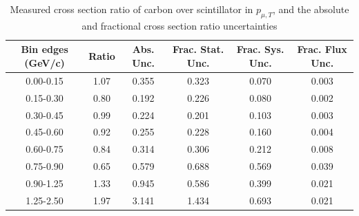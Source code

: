 \documentclass[../main.tex]{subfiles}
\begin{document}
\begin{table}
  \centering
  \renewcommand{\arraystretch}{1.15}
  \caption{Systematic covariance matrix of measured cross section ratio of carbon over scintillator in $p_{\mu,||}$}
  \label{tbl:rationucleonnuc6muon_pzc}
\end{table}
\begin{table}
  \centering
  \renewcommand{\arraystretch}{1.15}
  \caption{Measured cross section ratio of carbon over scintillator in $p_{\mu,T}$, and the absolute and fractional cross section ratio uncertainties}
    \begin{tabular}{c||c|c||c|c|c}
      Bin edges (GeV/c) &  Ratio  &  Abs. Unc.  &  Frac. Stat. Unc.  &  Frac. Sys. Unc.  &  Frac. Flux Unc. \\
      \hline
      \hline
      0.00-0.15 & 1.07 & 0.355 & 0.323 & 0.070 & 0.003\\
      0.15-0.30 & 0.80 & 0.192 & 0.226 & 0.080 & 0.002\\
      0.30-0.45 & 0.99 & 0.224 & 0.201 & 0.103 & 0.003\\
      0.45-0.60 & 0.92 & 0.255 & 0.228 & 0.160 & 0.004\\
      0.60-0.75 & 0.84 & 0.314 & 0.306 & 0.212 & 0.008\\
      0.75-0.90 & 0.65 & 0.579 & 0.688 & 0.569 & 0.039\\
      0.90-1.25 & 1.33 & 0.945 & 0.586 & 0.399 & 0.021\\
      1.25-2.50 & 1.97 & 3.141 & 1.434 & 0.693 & 0.021
    \end{tabular}
  \label{tbl:rationucleonnuc6muon_pta}
\end{table}
\end{document}
